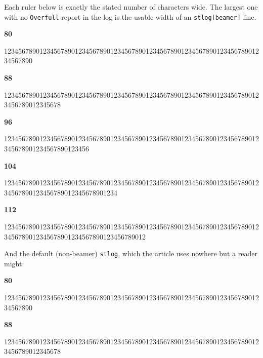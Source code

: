 \documentclass[bib]{statapress}
\begin{document}
\noindent Each ruler below is exactly the stated number of characters wide.
The largest one with no \texttt{Overfull} report in the log is the usable
width of an \texttt{stlog[beamer]} line.

\bigskip
\noindent\textbf{80}
\begin{stlog}[beamer]
12345678901234567890123456789012345678901234567890123456789012345678901234567890
\end{stlog}

\noindent\textbf{88}
\begin{stlog}[beamer]
1234567890123456789012345678901234567890123456789012345678901234567890123456789012345678
\end{stlog}

\noindent\textbf{96}
\begin{stlog}[beamer]
123456789012345678901234567890123456789012345678901234567890123456789012345678901234567890123456
\end{stlog}

\noindent\textbf{104}
\begin{stlog}[beamer]
12345678901234567890123456789012345678901234567890123456789012345678901234567890123456789012345678901234
\end{stlog}

\noindent\textbf{112}
\begin{stlog}[beamer]
1234567890123456789012345678901234567890123456789012345678901234567890123456789012345678901234567890123456789012
\end{stlog}

\bigskip
\noindent And the default (non-beamer) \texttt{stlog}, which the article uses
nowhere but a reader might:

\noindent\textbf{80}
\begin{stlog}
12345678901234567890123456789012345678901234567890123456789012345678901234567890
\end{stlog}

\noindent\textbf{88}
\begin{stlog}
1234567890123456789012345678901234567890123456789012345678901234567890123456789012345678
\end{stlog}
\end{document}
